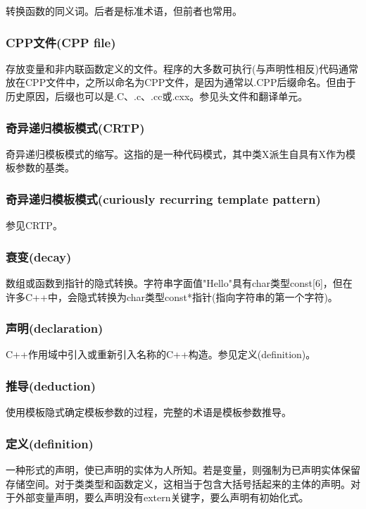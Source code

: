转换函数的同义词。后者是标准术语，但前者也常用。

\subsubsection{CPP文件(CPP file)}

存放变量和非内联函数定义的文件。程序的大多数可执行(与声明性相反)代码通常放在CPP文件中，之所以命名为CPP文件，是因为通常以.CPP后缀命名。但由于历史原因，后缀也可以是.C、.c、.cc或.cxx。参见头文件和翻译单元。

\subsubsection{奇异递归模板模式(CRTP)}

奇异递归模板模式的缩写。这指的是一种代码模式，其中类X派生自具有X作为模板参数的基类。

\subsubsection{奇异递归模板模式(curiously recurring template pattern)}

参见CRTP。

\subsubsection{衰变(decay)}

数组或函数到指针的隐式转换。字符串字面值"Hello"具有char类型const[6]，但在许多C++中，会隐式转换为char类型const*指针(指向字符串的第一个字符)。

\subsubsection{声明(declaration)}

C++作用域中引入或重新引入名称的C++构造。参见定义(definition)。

\subsubsection{推导(deduction)}

使用模板隐式确定模板参数的过程，完整的术语是模板参数推导。

\subsubsection{定义(definition)}

一种形式的声明，使已声明的实体为人所知。若是变量，则强制为已声明实体保留存储空间。对于类类型和函数定义，这相当于包含大括号括起来的主体的声明。对于外部变量声明，要么声明没有extern关键字，要么声明有初始化式。

